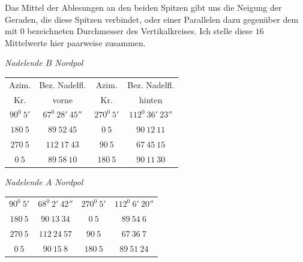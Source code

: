 Das Mittel der Ablesungen an den beiden Spitzen gibt uns die Neigung der Geraden, die diese Spitzen verbindet, oder einer Parallelen dazu gegenüber dem mit $0$ bezeichneten Durchmesser des Vertikalkreises. Ich stelle diese $16$ Mittelwerte hier paarweise zusammen.
\begin{center}
\textit{Nadelende $B$ Nordpol}\par\smallskip
{\fontsize{9}{11}\selectfont
\begin{tabular}{c|c||c|c}
Azim.&Bez. Nadelfl.&Azim.&Bez. Nadelfl.\\
Kr.&vorne&Kr.&hinten\\\hline
$90^0\ 5'$&$67^0\ 28'\ 45''$&$270^0\ 5'$&$112^0\ 36'\ 23''$\\
$180\ 5$&$89\ 52\ 45$&$0\ 5$&$90\ 12\ 11$\\
$270\ 5$&$112\ 17\ 43$&$90\ 5$&$67\ 45\ 15$\\
$0\ 5$&$89\ 58\ 10$&$180\ 5$&$90\ 11\ 30$
\end{tabular}}
\par\medskip
\textit{Nadelende $A$ Nordpol}\par\smallskip
{\fontsize{9}{11}\selectfont
\begin{tabular}{c|c||c|c}
$90^0\ 5'$&$68^0\ 2'\ 42''$&$270^0\ 5'$&$112^0\ 6'\ 20''$\\
$180\ 5$&$90\ 13\ 34$&$0\ 5$&$89\ 54\ 6$\\
$270\ 5$&$112\ 24\ 57$&$90\ 5$&$67\ 36\ 7$\\
$0\ 5$&$90\ 15\ 8$&$180\ 5$&$89\ 51\ 24$
\end{tabular}}
\end{center}

